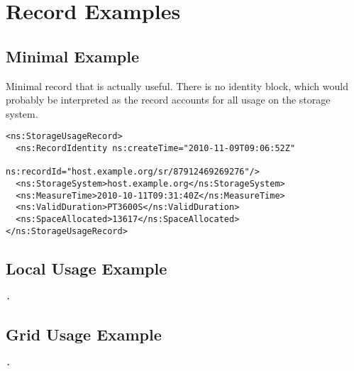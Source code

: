 
\section{Record Examples}


\subsection{Minimal Example}

Minimal record that is actually useful. There is no identity block, which would
probably be interpreted as the record accounts for all usage on the storage
system.

\begin{verbatim}
<ns:StorageUsageRecord>
  <ns:RecordIdentity ns:createTime="2010-11-09T09:06:52Z"
                     ns:recordId="host.example.org/sr/87912469269276"/>
  <ns:StorageSystem>host.example.org</ns:StorageSystem>
  <ns:MeasureTime>2010-10-11T09:31:40Z</ns:MeasureTime>
  <ns:ValidDuration>PT3600S</ns:ValidDuration>
  <ns:SpaceAllocated>13617</ns:SpaceAllocated>
</ns:StorageUsageRecord>
\end{verbatim}


\subsection{Local Usage Example}


\begin{verbatim}
.
\end{verbatim}



\subsection{Grid Usage Example}

\begin{verbatim}
.
\end{verbatim}


